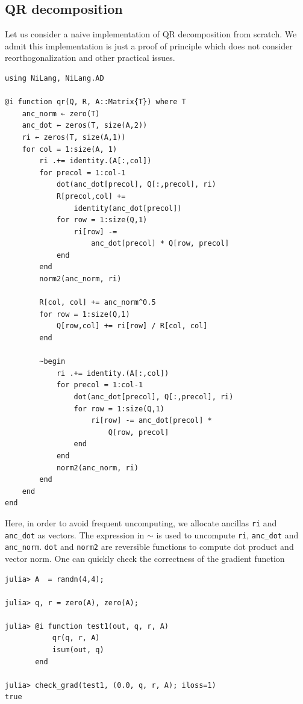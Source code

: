 \documentclass{article}
\newcommand{\<}{\langle}
\renewcommand{\>}{\rangle}
\theoremstyle{definition}\newtheorem{definition}{\textit{Definition}}
\begin{document}
\subsection{QR decomposition}

Let us consider a naive implementation of QR decomposition from scratch.
We admit this implementation is just a proof of principle which does not consider reorthogonalization and other practical issues.

\begin{minipage}{\columnwidth}
    \begin{lstlisting}[multicols=2]
using NiLang, NiLang.AD

@i function qr(Q, R, A::Matrix{T}) where T
    anc_norm ← zero(T)
    anc_dot ← zeros(T, size(A,2))
    ri ← zeros(T, size(A,1))
    for col = 1:size(A, 1)
        ri .+= identity.(A[:,col])
        for precol = 1:col-1
            dot(anc_dot[precol], Q[:,precol], ri)
            R[precol,col] += 
                identity(anc_dot[precol])
            for row = 1:size(Q,1)
                ri[row] -= 
                    anc_dot[precol] * Q[row, precol]
            end
        end
        norm2(anc_norm, ri)

        R[col, col] += anc_norm^0.5
        for row = 1:size(Q,1)
            Q[row,col] += ri[row] / R[col, col]
        end

        ~begin
            ri .+= identity.(A[:,col])
            for precol = 1:col-1
                dot(anc_dot[precol], Q[:,precol], ri)
                for row = 1:size(Q,1)
                    ri[row] -= anc_dot[precol] *
                        Q[row, precol]
                end
            end
            norm2(anc_norm, ri)
        end
    end
end
\end{lstlisting}
\end{minipage}

Here, in order to avoid frequent uncomputing, we allocate ancillas \texttt{ri} and \texttt{anc\_dot} as vectors.
The expression in $\sim$ is used to uncompute \texttt{ri}, \texttt{anc\_dot} and \texttt{anc\_norm}.
\texttt{dot} and \texttt{norm2} are reversible functions to compute dot product and vector norm.
One can quickly check the correctness of the gradient function

\begin{minipage}{.88\columnwidth}
\begin{lstlisting}
julia> A  = randn(4,4);

julia> q, r = zero(A), zero(A);

julia> @i function test1(out, q, r, A)
           qr(q, r, A)
           isum(out, q)
       end

julia> check_grad(test1, (0.0, q, r, A); iloss=1)
true
\end{lstlisting}
\end{minipage}
\end{document}
